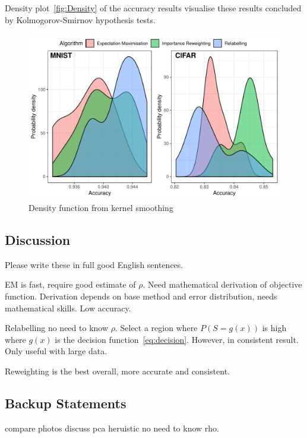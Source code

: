 \documentclass[12pt]{article} %
\begin{document}
Density plot~\eqref{fig:Density} of the accuracy results visualise these results concluded by Kolmogorov-Smirnov hypothesis tests.
\begin{figure}   
    \centering
	\includegraphics[scale=0.8]{histo}
	\caption{Density function from kernel smoothing}
	\label{fig:Density}
\end{figure}




\subsection{Discussion}
Please write these in full good English sentences.

EM is fast, require good estimate of $\rho$. Need mathematical derivation of objective function. Derivation depends on base method and error distribution, needs mathematical skills. Low accuracy.

Relabelling no need to know $\rho$. Select a region where $P(S=g(x))$ is high where $g(x)$ is the decision function~\eqref{eq:decision}. However, in consistent result. Only useful with large data.

Reweighting is the best overall, more accurate and consistent.

\subsection{Backup Statements}
compare photos
discuss pca
heruistic no need to know rho.
\end{document}
